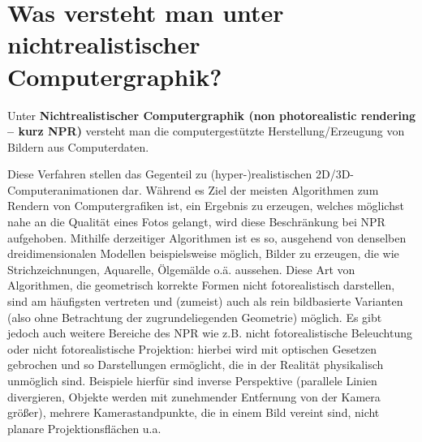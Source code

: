 \section{Was versteht man unter nichtrealistischer Computergraphik?}
Unter \textbf{Nichtrealistischer Computergraphik (non photorealistic rendering – 
kurz NPR)} versteht man die computergestützte Herstellung/Erzeugung von Bildern
aus Computerdaten. \par Diese Verfahren stellen das Gegenteil zu 
(hyper-)realistischen 2D/3D-Computer\-ani\-ma\-tio\-nen dar. Während es Ziel der 
meisten Algorithmen zum Rendern von Computergrafiken ist, ein Ergebnis zu 
erzeugen, welches möglichst nahe an die Qualität eines Fotos gelangt, wird 
diese Beschränkung bei NPR aufgehoben. Mithilfe derzeitiger Algorithmen ist es 
so, ausgehend von denselben dreidimensionalen Modellen beispielsweise möglich, 
Bilder zu erzeugen, die wie Strichzeichnungen, Aquarelle, Ölgemälde o.ä. 
aussehen. Diese Art von Algorithmen, die geometrisch korrekte Formen nicht 
fotorealistisch darstellen, sind am häufigsten vertreten und (zumeist) auch als 
rein bildbasierte Varianten (also ohne Betrachtung der zugrundeliegenden 
Geometrie) möglich. Es gibt jedoch auch weitere Bereiche des NPR wie z.B. nicht 
fotorealistische Beleuchtung oder nicht fotorealistische Projektion: hierbei 
wird mit optischen Gesetzen gebrochen und so Darstellungen ermöglicht, die in 
der Realität physikalisch unmöglich sind. Beispiele hierfür sind inverse 
Perspektive (parallele Linien divergieren, Objekte werden mit zunehmender 
Entfernung von der Kamera größer), mehrere Kamerastandpunkte, die in einem Bild 
vereint sind, nicht planare Projektionsflächen u.a.

